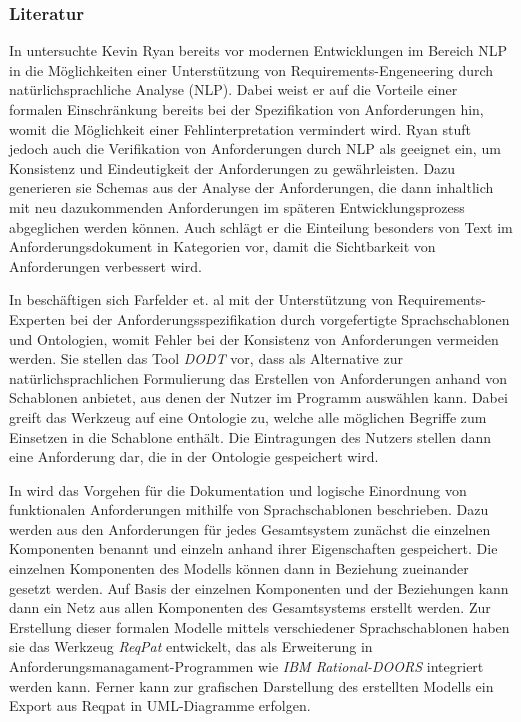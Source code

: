 \documentclass[12pt]{report}
\begin{document}
\subsubsection{Literatur}
In \cite{kr93} untersuchte Kevin Ryan bereits vor modernen Entwicklungen im Bereich NLP in die Möglichkeiten einer Unterstützung von Requirements-Engeneering durch natürlichsprachliche Analyse (NLP). Dabei weist er auf die Vorteile einer formalen Einschränkung bereits bei der Spezifikation von Anforderungen hin, womit die Möglichkeit einer Fehlinterpretation vermindert wird. Ryan stuft jedoch auch die Verifikation von Anforderungen durch NLP als geeignet ein, um Konsistenz und Eindeutigkeit der Anforderungen zu gewährleisten. Dazu generieren sie Schemas aus der Analyse der Anforderungen, die dann inhaltlich mit neu dazukommenden Anforderungen im späteren Entwicklungsprozess abgeglichen werden können. Auch schlägt er die Einteilung besonders von Text im Anforderungsdokument in Kategorien vor, damit die Sichtbarkeit von Anforderungen verbessert wird.

\vspace{12pt}

In \cite{ff11} beschäftigen sich Farfelder et. al mit der Unterstützung von Requirements-Experten bei der Anforderungsspezifikation durch vorgefertigte Sprachschablonen und Ontologien, womit Fehler bei der Konsistenz von Anforderungen vermeiden werden. Sie stellen das Tool \textit{DODT} vor, dass als Alternative zur natürlichsprachlichen Formulierung das Erstellen von Anforderungen anhand von Schablonen anbietet, aus denen der Nutzer im Programm auswählen kann. Dabei greift das Werkzeug auf eine Ontologie zu, welche alle möglichen Begriffe zum Einsetzen in die Schablone enthält. Die Eintragungen des Nutzers stellen dann eine Anforderung dar, die in der Ontologie gespeichert wird.

\vspace{12pt}

In \cite{fh14} wird das Vorgehen für die Dokumentation und logische Einordnung von funktionalen Anforderungen mithilfe von Sprachschablonen beschrieben. Dazu werden aus den Anforderungen für jedes Gesamtsystem zunächst die einzelnen Komponenten benannt und einzeln anhand ihrer Eigenschaften gespeichert. Die einzelnen Komponenten des Modells können dann in Beziehung zueinander gesetzt werden. Auf Basis der einzelnen Komponenten und der Beziehungen kann dann ein Netz aus allen Komponenten des Gesamtsystems erstellt werden. Zur Erstellung dieser formalen Modelle mittels verschiedener Sprachschablonen haben sie das Werkzeug \textit{ReqPat} entwickelt, das als Erweiterung in Anforderungsmanagament-Programmen wie \textit{IBM Rational-DOORS} integriert werden kann. Ferner kann zur grafischen Darstellung des erstellten Modells ein Export aus Reqpat in UML-Diagramme erfolgen.
\end{document}
